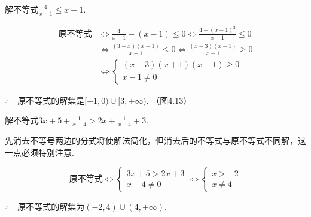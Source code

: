 \begin{example}
解不等式$\frac{4}{x-1}\le x-1$.
\end{example}

\begin{solution}
\[\begin{split}
    \text{原不等式}&\Longleftrightarrow \frac{4}{x-1}-(x-1)\le 0 \Longleftrightarrow \frac{4-(x-1)^2}{x-1}\le 0\\
    &\Longleftrightarrow \frac{(3-x)(x+1)}{x-1}\le 0 \Longleftrightarrow \frac{(x-3)(x+1)}{x-1}\ge 0\\
    &\Longleftrightarrow \begin{cases}
        (x-3)(x+1)(x-1)\ge 0\\
        x-1\ne 0
    \end{cases}
\end{split}\]

$\therefore\quad $原不等式的解集是$[-1,0)\cup[3,+\infty)$. （图4.13）
\end{solution}

\begin{figure}[htp]
    \centering
{}
    \caption{}
\end{figure}

\begin{example}
    解不等式$3x+5+\frac{1}{x-4}>2x+\frac{1}{x-4}+3$.
\end{example}

\begin{analyze}
    先消去不等号两边的分式将使解法简化，但消去后的不等式与原不等式不同解，这一点必须特别注意.
\end{analyze}

\begin{solution}
\[\text{原不等式}\Longleftrightarrow \begin{cases}
    3x+5>2x+3\\ x-4\ne 0
\end{cases} \Longleftrightarrow \begin{cases}
    x>-2\\ x\ne 4
\end{cases}\]

$\therefore\quad $原不等式的解集为$(-2,4)\cup (4,+\infty)$.
\end{solution}

